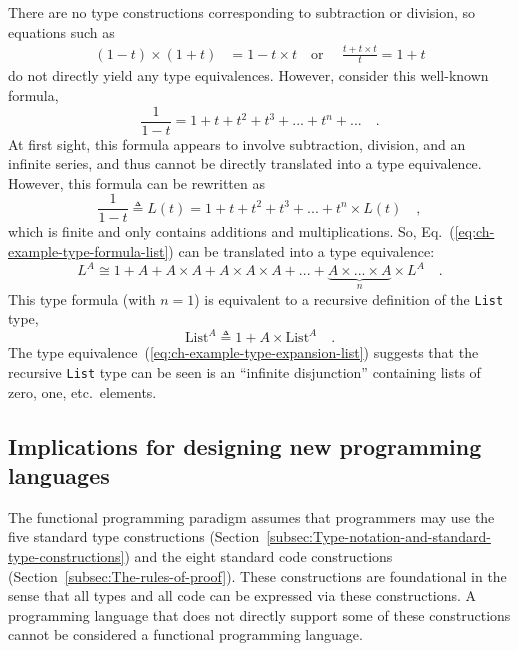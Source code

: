 There are no type constructions corresponding to subtraction or division,
so equations such as 
\begin{align*}
\left(1-t\right)\times\left(1+t\right) & =1-t\times t\quad\text{or }\quad\frac{t+t\times t}{t}=1+t
\end{align*}
do not directly yield any type equivalences. However, consider this
well-known formula,
\[
\frac{1}{1-t}=1+t+t^{2}+t^{3}+...+t^{n}+...\quad.
\]
At first sight, this formula appears to involve subtraction, division,
and an infinite series, and thus cannot be directly translated into
a type equivalence. However, this formula can be rewritten as
\begin{equation}
\frac{1}{1-t}\triangleq L(t)=1+t+t^{2}+t^{3}+...+t^{n}\times L(t)\quad,\label{eq:ch-example-type-formula-list}
\end{equation}
which is finite and only contains additions and multiplications. So,
Eq.~(\ref{eq:ch-example-type-formula-list}) can be translated into
a type equivalence:
\begin{equation}
L^{A}\cong1+A+A\times A+A\times A\times A+...+\underbrace{A\times...\times A}_{n}\times L^{A}\quad.\label{eq:ch-example-type-expansion-list}
\end{equation}
This type formula (with $n=1$) is equivalent to a recursive definition
of the \lstinline!List! type,
\[
\text{List}^{A}\triangleq1+A\times\text{List}^{A}\quad.
\]
The type equivalence~(\ref{eq:ch-example-type-expansion-list}) suggests
that the recursive \lstinline!List! type can be seen is an ``infinite
disjunction'' containing lists of zero, one, etc.~elements.

\subsection{Implications for designing new programming languages}

The functional programming paradigm assumes that programmers may use
the five standard type constructions (Section~\ref{subsec:Type-notation-and-standard-type-constructions})
and the eight standard code constructions (Section~\ref{subsec:The-rules-of-proof}).
These constructions are foundational in the sense that all types and
all code can be expressed via these constructions. A programming language
that does not directly support some of these constructions cannot
be considered a functional programming language.

